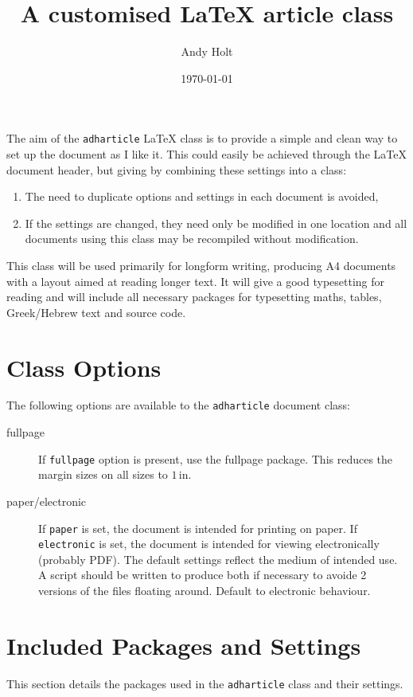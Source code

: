 \documentclass{adharticle}  %
\title{A customised \LaTeX{} article class}
\author{Andy Holt}
\date{\today}
\begin{document}
\maketitle

\noindent
The aim of the \texttt{adharticle} \LaTeX{} class is to provide a
simple and clean way to set up the document as I like it. This could easily be
achieved through the \LaTeX{} document header, but giving by combining these
settings into a class:
\begin{enumerate}
\item The need to duplicate options and settings in each document is avoided,
\item If the settings are changed, they need only be modified in one location
  and all documents using this class may be recompiled without modification.
\end{enumerate}

This class will be used primarily for longform writing, producing A4 documents
with a layout aimed at reading longer text. It will give a good typesetting for
reading and will include all necessary packages for typesetting maths, tables,
Greek/Hebrew text and source code.

\section{Class Options}

The following options are available to the \texttt{adharticle} document class:
\begin{description}
\item[fullpage] If \texttt{fullpage} option is present, use the fullpage
  package. This reduces the margin sizes on all sizes to $1\,\mathrm{in}$.
\item[paper/electronic] If \texttt{paper} is set, the document is intended for
  printing on paper. If \texttt{electronic} is set, the document is intended for
  viewing electronically (probably PDF). The default settings reflect the medium
  of intended use. A script should be written to produce both if necessary to
  avoide 2 versions of the files floating around. Default to electronic
  behaviour.
\end{description}


\section{Included Packages and Settings}

This section details the packages used in the \texttt{adharticle} class and
their settings.
\end{document}
